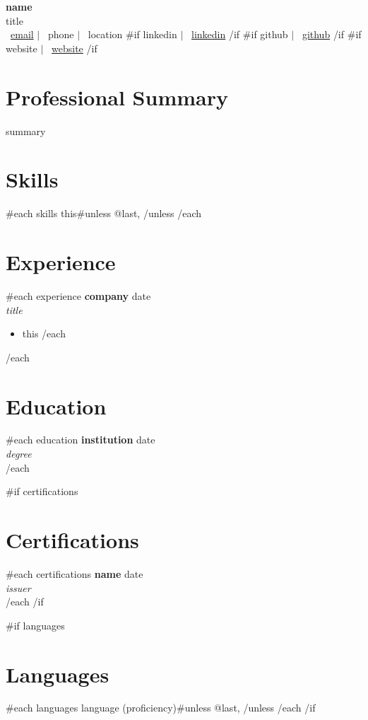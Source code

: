 \documentclass[11pt,a4paper]{article}
\begin{document}
\begin{center}
    {\LARGE \textbf{{name}}}\\[0.3em]
    {\large {title}}\\[0.5em]
    {\small 
    \faEnvelope\ \href{mailto:{email}}{{email}} $|$
    \faPhone\ {phone} $|$
    \faMapMarker\ {location}
    {{#if linkedin}}
    $|$ \faLinkedin\ \href{https://www.linkedin.com/in/{linkedin}}{linkedin}
    {{/if}}
    {{#if github}}
    $|$ \faGithub\ \href{https://github.com/{github}}{github}
    {{/if}}
    {{#if website}}
    $|$ \faGlobe\ \href{https://{website}}{{website}}
    {{/if}}
    }
\end{center}

\section{Professional Summary}
{summary}

\section{Skills}
{{#each skills}}
{{this}}{{#unless @last}}, {{/unless}}
{{/each}}

\section{Experience}
{{#each experience}}
\textbf{{company}} \hfill {{date}}\\
\textit{{title}}\\
\begin{itemize}[leftmargin=*,nosep]
{{#each description}}
    \item {{{this}}}
{{/each}}
\end{itemize}
{{/each}}

\section{Education}
{{#each education}}
\textbf{{institution}} \hfill {{date}}\\
\textit{{degree}}\\
{{/each}}

{{#if certifications}}
\section{Certifications}
{{#each certifications}}
\textbf{{name}} \hfill {{date}}\\
\textit{{issuer}}\\
{{/each}}
{{/if}}

{{#if languages}}
\section{Languages}
{{#each languages}}
{{language}} ({{proficiency}}){{#unless @last}}, {{/unless}}
{{/each}}
{{/if}}
\end{document}
